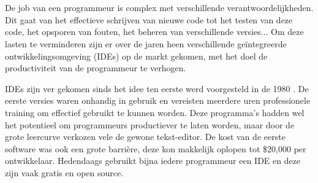 


\chapter{}
\label{ch:inleiding}

De job van een programmeur is complex met verschillende verantwoordelijkheden. Dit gaat van het effectieve schrijven van nieuwe code tot het testen van deze code, het opsporen van fouten, het beheren van verschillende versies... Om deze lasten te verminderen zijn er over de jaren heen verschillende geïntegreerde ontwikkelingsomgeving (IDEs) op de markt gekomen, met het doel de productiviteit van de programmeur te verhogen. 

IDEs zijn ver gekomen sinds het idee ten eerste werd voorgesteld in de 1980 \autocite{Kline2005}. De eerste versies waren onhandig in gebruik en vereisten meerdere uren professionele training om effectief gebruikt te kunnen worden. Deze programma’s hadden wel het potentieel om programmeurs productiever te laten worden, maar door de grote leercurve verkozen vele de gewone tekst-editor. De kost van de eerste software was ook een grote barrière, deze kon makkelijk oplopen tot \$20,000 per ontwikkelaar. Hedendaags gebruikt bijna iedere programmeur een IDE en deze zijn vaak gratis en open source.

